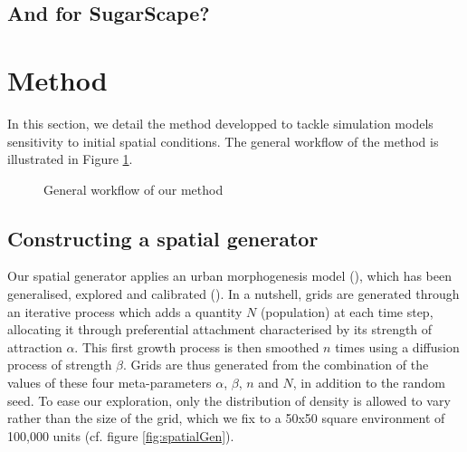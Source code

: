 \documentclass[11pt]{article}
\begin{document}
\subsection{And for SugarScape?}


\section{Method}

In this section, we detail the method developped to tackle simulation models sensitivity to initial spatial conditions. The general workflow of the method is illustrated in Figure \ref{fig:method}.

\begin{figure}[htbp] \begin{center} 
 \caption{General workflow of our method} \label{fig:method} \end{center} \end{figure} %


\subsection{Constructing a spatial generator}

Our spatial generator applies an urban morphogenesis model (\cite{Batty2007}), which has been generalised, explored and calibrated (\cite{Raimbault2014}). In a nutshell, grids are generated through an iterative process which adds a quantity $N$ (population) at each time step, allocating it through preferential attachment characterised by its strength of attraction $\alpha$. This first growth process is then smoothed $n$ times using a diffusion process of strength $\beta$. Grids are thus generated from the combination of the values of these four meta-parameters $\alpha$, $\beta$, $n$ and $N$, in addition to the random seed. To ease our exploration, only the distribution of density is allowed to vary rather than the size of the grid, which we fix to a 50x50 square environment of 100,000 units (cf. figure \ref{fig:spatialGen}).
\end{document}
